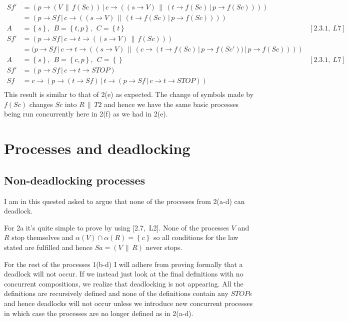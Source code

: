 \documentclass[11pt,a4paper]{article}
\def\ra{\rightarrow}
\def\cc{\,\|\,}
\def\ch{\,|\,}
\newcommand{\sN}[1]{\left \lbrace #1 \right \rbrace}
\begin{document}
\begin{align*}
    Sf'   &= (p \ra (V \cc f(Sc))  \ch c \ra ((s \ra V) \cc
             (t \ra f(Sc) \ch p \ra f(Sc)))) & \\
          &= (p \ra Sf  \ch c \ra ((s \ra V) \cc
             (t \ra f(Sc) \ch p \ra f(Sc)))) & \\
        A &= \sN{s},~~ B = \sN{t,p},~~ C = \sN{t} & [2.3.1,~L7] \\
    Sf'   &= (p \ra Sf  \ch
              c \ra t \ra ((s \ra V) \cc f(Sc))) & \\
          &= (p \ra Sf  \ch
              c \ra t \ra ((s \ra V) \cc
                            (c \ra (t \ra f(Sc) \ch p \ra f(Sc')) \ch p \ra f(Sc)))) & \\
        A &= \sN{s},~~ B = \sN{c,p},~~ C = \sN{ } & [2.3.1,~L7] \\
    Sf'   &= (p \ra Sf \ch c \ra t \ra STOP) & \\
    Sf &= c \ra (p \ra (t \ra Sf)
            \ch t \ra  (p \ra Sf \ch c \ra t \ra STOP)) & \\
\end{align*}
This result is similar to that of 2(e) as expected. The change of symbols made
by $f(Sc)$ changes $Sc$ into $R \cc T2$ and hence we have the same basic
processes being run concurrently here in 2(f) as we had in 2(e).

\section{Processes and deadlocking}

\subsection{Non-deadlocking processes}
I am in this quested asked to argue that none of the processes from 2(a-d) can
deadlock.

For 2a it's quite simple to prove by using [2.7,~L2]. None of the
processes $V$ and $R$ stop themselves and $\alpha(V) \cap \alpha(R) = \sN{c}$ so
all conditions for the law stated are fulfilled and hence $Sa = (V \cc R)$ never
stops.

For the rest of the processes 1(b-d) I will adhere from proving formally that a
deadlock will not occur. If we instead just look at the final definitions with
no concurrent compositions, we realize that deadlocking is not appearing. All
the definitions are recursively defined and none of the definitions contain any
$STOP$s and hence deadlocks will not occur unless we introduce new concurrent
processes in which case the processes are no longer defined as in 2(a-d).
\end{document}
